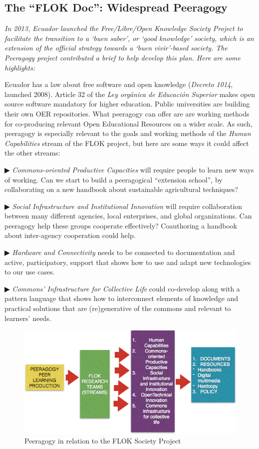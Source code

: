 \begin{mdframed}
\subsection{The ``FLOK Doc'': Widespread Peeragogy}
\noindent \emph{In 2013, Ecuador launched the Free/Libre/Open Knowledge Society Project to facilitate the transition to a ‘\emph{buen saber}’, or ‘good knowledge’ society, which is an extension of the official strategy towards a ‘\emph{buen vivir}’-based society.  The Peeragogy project contributed a brief to help develop this plan.  Here are some highlights:}

Ecuador has a law about free software and open knowledge (\emph{Decreto 1014}, launched 2008). Article 32 of the \emph{Ley orgánica de Educación Superior} makes open source software mandatory for higher education. Public universities are building their own  OER repositories. What peeragogy can offer are are working methods for co-producing relevant Open Educational Resources on a wider scale.  As such, peeragogy is especially relevant to the goals and working methods of the \emph{Human Capabilities} stream of the FLOK project, but here are some ways it could affect the other streams:

▶ \emph{Commons-oriented Productive Capacities} will require people to learn new ways of working. Can we start to build a peeragogical “extension school”, by collaborating on a new handbook about sustainable agricultural techniques?

▶ \emph{Social Infrastructure and Institutional Innovation} will require collaboration between many different agencies, local enterprises, and global organizations. Can peeragogy help these groups cooperate effectively?  Coauthoring a handbook about inter-agency cooperation could help.

▶ \emph{Hardware and Connectivity} needs to be connected to documentation and active, participatory, support that shows how to use and adapt new technologies to our use cases. 

▶ \emph{Commons’ Infrastructure for Collective Life} could co-develop along with a pattern language that shows how to interconnect elements of knowledge and practical solutions that are (re)generative of the commons and relevant to learners' needs. 
\end{mdframed}

\begin{figure}
\includegraphics[width=\textwidth]{../pictures/flok1.png}
\caption*{Peeragogy in relation to the FLOK Society Project}
\end{figure}

